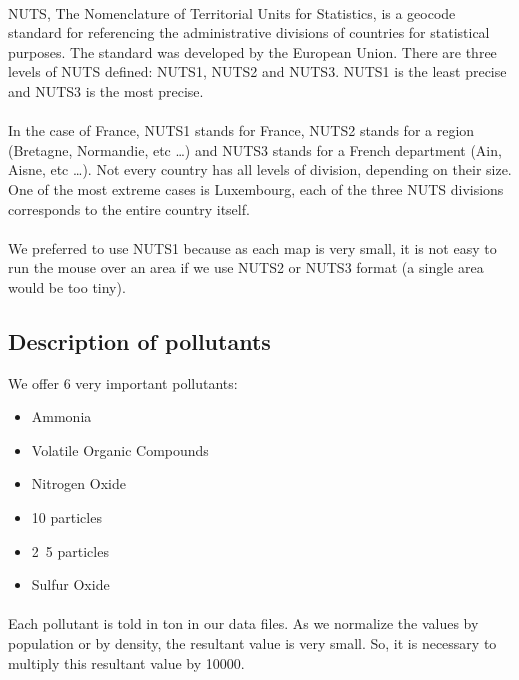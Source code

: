 \documentclass[preprint,journal]{vgtc}       %
\begin{document}
\paragraph{}
NUTS, The Nomenclature of Territorial Units for Statistics, is a geocode standard for referencing the administrative divisions of countries for statistical purposes. The standard was developed by the European Union. There are three levels of NUTS defined: NUTS1, NUTS2 and NUTS3. NUTS1 is the least precise and NUTS3 is the most precise.
\paragraph{}
In the case of France, NUTS1 stands for France, NUTS2 stands for a region (Bretagne, Normandie, etc …) and NUTS3 stands for a French department (Ain, Aisne, etc …). Not every country has all levels of division, depending on their size. One of the most extreme cases is Luxembourg, each of the three NUTS divisions corresponds to the entire country itself.
\paragraph{}
We preferred to use NUTS1 because as each map is very small, it is not easy to run the mouse over an area if we use NUTS2 or NUTS3 format (a single area would be too tiny).

	\subsection{Description of pollutants}
	We offer 6 very important pollutants:
	\begin{itemize}[parsep=0cm,itemsep=0cm]
	\item Ammonia
	\item Volatile Organic Compounds
	\item Nitrogen Oxide
	\item \unit{10}{\micro\meter} particles
	\item \unit{2.5}{\micro\meter} particles
	\item Sulfur Oxide
	\end{itemize}

\paragraph{}
Each pollutant is told in ton in our data files. As we normalize the values by population or by density, the resultant value is very small. So, it is necessary to multiply this resultant value by 10000. 
\end{document}
